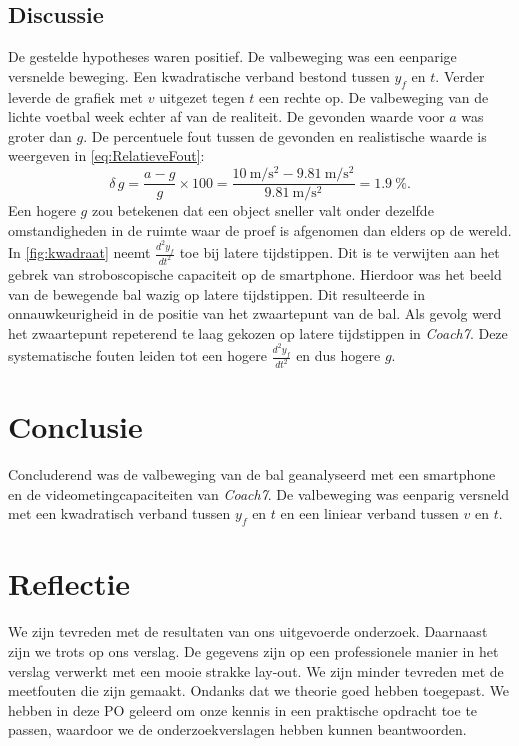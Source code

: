 \documentclass{scrartcl}
\begin{document}
\subsection{Discussie}
De gestelde hypotheses waren positief. De valbeweging was een eenparige versnelde beweging. Een kwadratische verband bestond tussen $y_f$ en $t$. Verder leverde de grafiek met $v$ uitgezet tegen $t$ een rechte op. De valbeweging van de lichte voetbal week echter af van de realiteit. De gevonden waarde voor $a$ was groter dan $g$. De percentuele fout tussen de gevonden en realistische waarde is weergeven in \cref{eq:RelatieveFout}:
\begin{equation}\label{eq:RelatieveFout}
\delta \, g=\frac{a-g}{g}\times 100= \frac{\SI{10}{\meter\per\second\squared}-\SI{9.81}{\meter\per\second\squared}}{\SI{9.81}{\meter\per\second\squared}}=\SI{1.9}{\percent}\mathrm{.}
\end{equation}
Een hogere $g$ zou betekenen dat een object sneller valt onder dezelfde omstandigheden in de ruimte waar de proef is afgenomen dan elders op de wereld. In \cref{fig:kwadraat} neemt $\frac{d^2y_f}{dt^2}$ toe bij latere tijdstippen. Dit is te verwijten aan het gebrek van stroboscopische capaciteit op de smartphone. Hierdoor was het beeld van de bewegende bal wazig op latere tijdstippen. Dit resulteerde in onnauwkeurigheid in de positie van het zwaartepunt van de bal. Als gevolg werd het zwaartepunt repeterend te laag gekozen op latere tijdstippen in \textit{Coach7}. Deze systematische fouten leiden tot een hogere $\frac{d^2y_f}{dt^2}$ en dus hogere $g$.
%
\section{Conclusie}
Concluderend was de valbeweging van de bal geanalyseerd met een smartphone en de videometingcapaciteiten van \textit{Coach7}. De valbeweging was eenparig versneld met een kwadratisch verband tussen $y_f$ en $t$ en een liniear verband tussen $v$ en $t$.
\section{Reflectie}
We zijn tevreden met de resultaten van ons uitgevoerde onderzoek. Daarnaast zijn we trots op ons verslag. De gegevens zijn op een professionele manier in het verslag verwerkt met een mooie strakke lay-out. We zijn minder tevreden met de meetfouten die zijn gemaakt. Ondanks dat we theorie goed hebben toegepast. We hebben in deze PO geleerd om onze kennis in een praktische opdracht toe te passen, waardoor we de onderzoekverslagen hebben kunnen beantwoorden.
\newpage
\appendix
\end{document}
